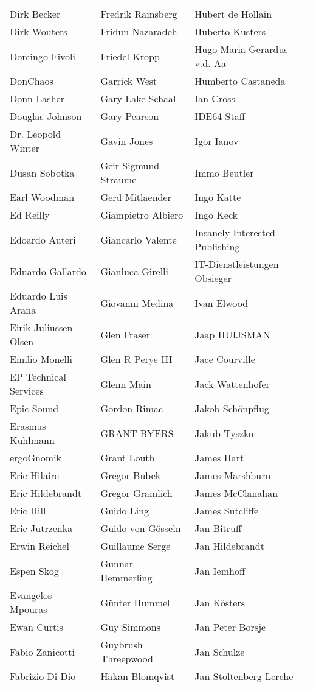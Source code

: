 \begin{small}
\begin{tabular}{p{4cm}p{4cm}p{4cm}}
Dirk Becker & Fredrik Ramsberg & Hubert de Hollain \\
Dirk Wouters & Fridun Nazaradeh & Huberto Kusters \\
Domingo Fivoli & Friedel Kropp & Hugo Maria Gerardus v.d. Aa \\
DonChaos & Garrick West & Humberto Castaneda \\
Donn Lasher & Gary Lake-Schaal & Ian Cross \\
Douglas Johnson & Gary Pearson & IDE64 Staff \\
Dr. Leopold Winter & Gavin Jones & Igor Ianov \\
Dusan Sobotka & Geir Sigmund Straume & Immo Beutler \\
Earl Woodman & Gerd Mitlaender & Ingo Katte \\
Ed Reilly & Giampietro Albiero & Ingo Keck \\
Edoardo Auteri & Giancarlo Valente & Insanely Interested Publishing \\
Eduardo Gallardo & Gianluca Girelli & IT-Dienstleistungen Obsieger \\
Eduardo Luis Arana & Giovanni Medina & Ivan Elwood \\
Eirik Juliussen Olsen & Glen Fraser & Jaap HUIJSMAN \\
Emilio Monelli & Glen R Perye III & Jace Courville \\
EP Technical Services & Glenn Main & Jack Wattenhofer \\
Epic Sound & Gordon Rimac & Jakob Schönpflug \\
Erasmus Kuhlmann & GRANT BYERS & Jakub Tyszko \\
ergoGnomik & Grant Louth & James Hart \\
Eric Hilaire & Gregor Bubek & James Marshburn \\
Eric Hildebrandt & Gregor Gramlich & James McClanahan \\
Eric Hill & Guido Ling & James Sutcliffe \\
Eric Jutrzenka & Guido von Gösseln & Jan Bitruff \\
Erwin Reichel & Guillaume Serge & Jan Hildebrandt \\
Espen Skog & Gunnar Hemmerling & Jan Iemhoff \\
Evangelos Mpouras & Günter Hummel & Jan Kösters \\
Ewan Curtis & Guy Simmons & Jan Peter Borsje \\
Fabio Zanicotti & Guybrush Threepwood & Jan Schulze \\
Fabrizio Di Dio & Hakan Blomqvist & Jan Stoltenberg-Lerche \\

\end{tabular}
\end{small}
